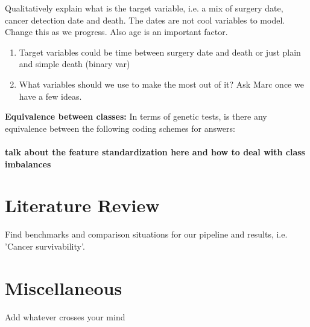 \documentclass[a4paper]{article}
\begin{document}
Qualitatively explain what is the target variable, i.e. a mix of surgery date, cancer detection date and death. The dates are not cool variables to model. Change this as we progress. Also age is an important factor. \\ 
\begin{enumerate}
\item Target variables could be time between surgery date and death or just plain and simple death (binary var)
\item What variables should we use to make the most out of it? Ask Marc once we have a few ideas. 
\end{enumerate}
%
\textbf{Equivalence between classes:}
In terms of genetic tests, is there any equivalence between the following coding schemes for answers:\\
\\

\textbf{talk about the feature standardization here and how to deal with class imbalances}


\section{Literature Review}
Find benchmarks and comparison situations for our pipeline and results, i.e. 'Cancer survivability'.

\section{Miscellaneous}
Add whatever crosses your mind
\end{document}

